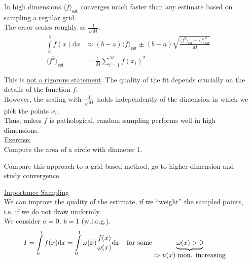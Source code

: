 In high dimensions $\langle f \rangle_\text{est}$ converges much faster than any estimate based on sampling a regular grid.\\
The error scales roughly as $\frac{1}{\sqrt{M}}$.
\begin{align}
	\int\limits_{a}^{b} f(x) \text{d}x &\approx (b-a) \langle f\rangle_\text{est} \pm (b-a) \sqrt{\frac{\langle f^2\rangle_\text{est}-\langle f \rangle_\text{est}^2}{M}}\\
	\langle f^2\rangle_\text{est} &= \frac{1}{M} \sum\limits_{i=1}^M f(x_i)^2
\end{align}

This is \underline{not a rigorous statement}. The quality of the fit depends crucially on the details of the function $f$.\\

However, the scaling with $\frac{1}{\sqrt{M}}$ holds independently of the dimension in which we pick the points $x_i$.\\
Thus, unless $f$ is pathological, random sampling performs well in high dimensions.\\

\underline{Exercise:}\\
Compute the area of a circle with diameter 1.\\
Compare this approach to a grid-based method, go to higher dimension and study convergence.

\underline{Importance Sampling}\\
We can improve the quality of the estimate, if we ``weight'' the sampled points, i.e. if we do not draw uniformly.\\
We consider $a=0,\ b=1$ (w.l.o.g.).
\begin{align}
	I &= \int\limits_0^1f(x)\text{d}x = \int\limits_0^1\omega(x)\frac{f(x)}{\omega(x)}\text{d}x \quad\text{for some} \underbrace{\omega(x)>0}_{\parbox{3.7cm}{$\Rightarrow u(x)\ \text{mon. increasing}$}}
\end{align}

